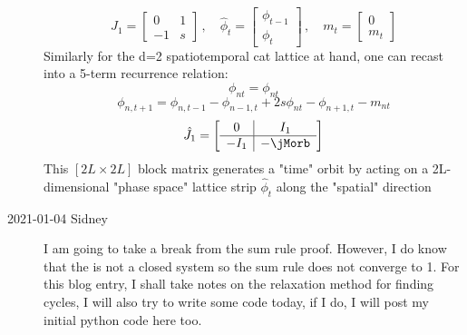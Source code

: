 \begin{description}
$$\hat{J}_1=\left[\begin{array}{cc}
0 & 1\\
-1 & s
\end{array}\right]
\,,\quad
\hat{\phi}_t=\left[\begin{array}{c}
\phi_{t-1}\\
\phi_t
\end{array}\right]
\,,\quad
m_t=\left[\begin{array}{c}
0\\
m_t
\end{array}\right]
$$
Similarly for the d=2 spatiotemporal cat lattice at hand, one can recast
into a 5-term recurrence relation:
$$\phi_{nt}=\phi_{nt}$$
$$\phi_{n,t+1}=\phi_{n,t-1}-\phi_{n-1,t}+2s\phi_{nt}-\phi_{n+1,t}-m_{nt}$$
$$\hat{J}_1=\left[\begin{array}{c|c}
0 & I_1\\
\hline
-I_1 & -\jMorb
\end{array}\right]
$$
This $[2L\times2L]$ block matrix generates a "time" orbit by acting on a
2L-dimensional "phase space" lattice strip $\hat{\phi}_t$ along the
"spatial" direction

\item[2021-01-04 Sidney]
I am going to take a break from the sum rule proof. However, I do know
that the {\HenonMap} is not a closed system so the sum rule does not
converge to 1. For this blog entry, I shall take notes on the relaxation
method for finding cycles, I will also try to write some code today, if I
do, I will post my initial python code here too.


\end{description}
